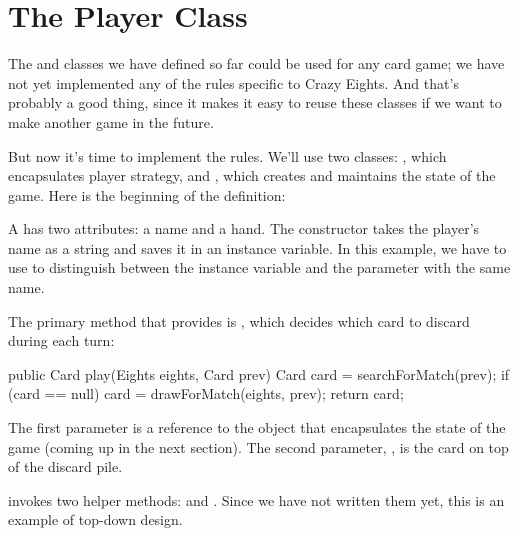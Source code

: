 

\section{The Player Class}
\label{extending-classes_player-class}

The  and  classes we have defined so far could be used for any card game; we have not yet implemented any of the rules specific to Crazy Eights.
And that's probably a good thing, since it makes it easy to reuse these classes if we want to make another game in the future.


But now it's time to implement the rules.
We'll use two classes: , which encapsulates player strategy, and , which creates and maintains the state of the game.
Here is the beginning of the  definition:


\begin{code}
public class Player {

    private String name;
    private Hand hand;

    public Player(String name) {
        this.name = name;
        this.hand = new Hand(name);
    }
\end{code}

A  has two  attributes: a name and a hand.
The constructor takes the player's name as a string and saves it in an instance variable.
In this example, we have to use  to distinguish between the instance variable and the parameter with the same name.

The primary method that  provides is , which decides which card to discard during each turn:

\begin{code}
public Card play(Eights eights, Card prev) {
    Card card = searchForMatch(prev);
    if (card == null) {
        card = drawForMatch(eights, prev);
    }
    return card;
}
\end{code}

The first parameter is a reference to the  object that encapsulates the state of the game (coming up in the next section).
The second parameter, , is the card on top of the discard pile.

 invokes two helper methods:  and .
Since we have not written them yet, this is an example of top-down design.

